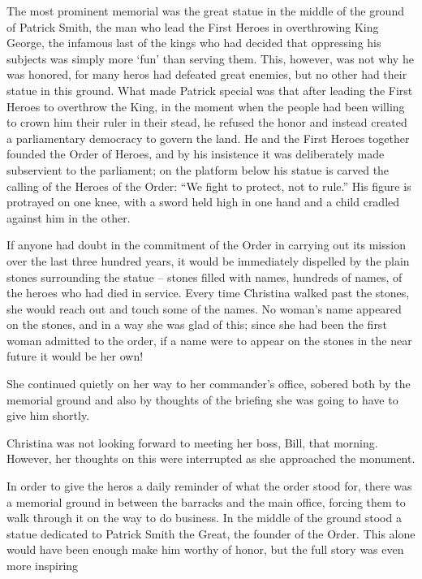 \documentclass[showtrims,b6paper,draft,10pt]{memoir}
\begin{document}
The most prominent memorial was the great statue in the middle of the ground of Patrick Smith, the man who lead the First Heroes in overthrowing King George, the infamous last of the kings who had decided that oppressing his subjects was simply more `fun' than serving them.  This, however, was not why he was honored, for many heros had defeated great enemies, but no other had their statue in this ground.  What made Patrick special was that after leading the First Heroes to overthrow the King, in the moment when the people had been willing to crown him their ruler in their stead, he refused the honor and instead created a parliamentary democracy to govern the land.  He and the First Heroes together founded the Order of Heroes, and by his insistence it was deliberately made subservient to the parliament;  on the platform below his statue is carved the calling of the Heroes of the Order:  ``We fight to protect, not to rule.''  His figure is protrayed on one knee, with a sword held high in one hand and a child cradled against him in the other.

If anyone had doubt in the commitment of the Order in carrying out its mission over the last three hundred years, it would be immediately dispelled by the plain stones surrounding the statue -- stones filled with names, hundreds of names, of the heroes who had died in service.  Every time Christina walked past the stones, she would reach out and touch some of the names.  No woman's name appeared on the stones, and in a way she was glad of this;  since she had been the first woman admitted to the order, if a name were to appear on the stones in the near future it would be her own!

She continued quietly on her way to her commander's office, sobered both by the memorial ground and also by thoughts of the briefing she was going to have to give him shortly.

\timeskip

Christina was not looking forward to meeting her boss, Bill, that morning.  However, her thoughts on this were interrupted as she approached the monument.

In order to give the heros a daily reminder of what the order stood for, there was a memorial ground in between the barracks and the main office, forcing them to walk through it on the way to do business.  In the middle of the ground stood a statue dedicated to Patrick Smith the Great, the founder of the Order.  This alone would have been enough make him worthy of honor, but the full story was even more inspiring
\end{document}
